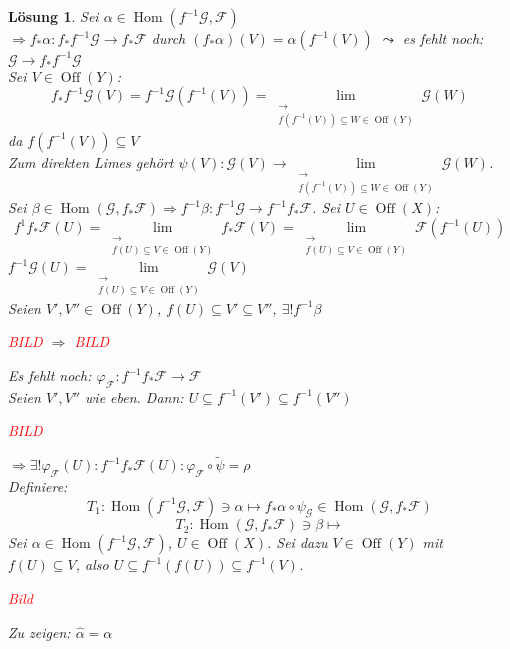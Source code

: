 \documentclass[a4paper,12pt]{report}
\theoremstyle{break}
\newtheorem{Loes}{L\"osung}
\theoremstyle{nonumberbreak}
\theoremstyle{nonumberplain}
\DeclareMathOperator{\Hom}{Hom}
\DeclareMathOperator{\Off}{Off}
\newcommand{\calF}{\mathcal{F}}
\newcommand{\calG}{\mathcal{G}}
\begin{document}
\begin{Loes}
Sei $\alpha \in \Hom(f^{-1}\calG, \calF)$\\
$\Rightarrow f_*\alpha : f_*f^{-1}\calG \to f_*\calF$ durch $(f_*\alpha)(V) = \alpha (f^{-1}(V))$ $\leadsto$ es fehlt noch: $\calG \to f_{*}f^{-1}\calG$\\
Sei $V \in \Off(Y)$:
	\[ f_{*}f^{-1}\calG(V) = f^{-1}\calG(f^{-1}(V)) = \lim\limits_{\substack{\to \\ f(f^{-1}(V)) \subseteq W \in \Off(Y)}} \calG(W)\]
da $f(f^{-1}(V)) \subseteq V$\\
Zum direkten Limes geh\"ort $\psi(V): \calG(V) \to \lim\limits_{\substack{\to \\ f(f^{-1}(V)) \subseteq W \in \Off(Y)}} \calG(W)$.\\
Sei $\beta \in \Hom(\calG, f_*\calF) \Rightarrow f^{-1}\beta: f^{-1}\calG \to f^{-1} f_*\calF$. Sei $U\in \Off(X)$:
	\[f^{1}f_*\calF(U) = \lim\limits_{\substack{\to \\ f(U) \subseteq V \in \Off(Y)}} f_*\calF(V) = \lim\limits_{\substack{\to \\ f(U) \subseteq V \in \Off(Y)}}\calF(f^{-1}(U)) \]
$f^{-1}\calG(U) = \lim\limits_{\substack{\to \\ f(U) \subseteq V \in \Off(Y)}} \calG(V)$\\
Seien $V', V'' \in \Off(Y)$, $f(U) \subseteq V' \subseteq V''$, $\exists! f^{-1}\beta$
\begin{center}
\textcolor{red}{BILD} $\Rightarrow$ \textcolor{red}{BILD}
\end{center}
Es fehlt noch: $\varphi_\calF: f^{-1}f_*\calF \to \calF$\\
Seien $V',V''$ wie eben. Dann: $U\subseteq f^{-1}(V') \subseteq f^{-1}(V'')$
\begin{center}
\textcolor{red}{BILD}
\end{center}
$\Rightarrow \exists! \varphi_\calF(U): f^{-1}f_*\calF(U): \varphi_\calF \circ \tilde \psi = \rho$\\
Definiere:
	\[ T_1: \Hom(f^{-1}\calG, \calF) \ni \alpha \mapsto f_* \alpha \circ \psi_\calG \in \Hom(\calG, f_*\calF) \]
	\[ T_2: \Hom(\calG, f_*\calF) \ni \beta \mapsto \]
Sei $\alpha \in \Hom(f^{-1}\calG, \calF)$, $U\in \Off(X)$. Sei dazu $V\in \Off(Y)$ mit $f(U)\subseteq V$, also $U\subseteq f^{-1}(f(U)) \subseteq f^{-1}(V)$.\\
\begin{center}
\textcolor{red}{Bild}
\end{center}
Zu zeigen: $\hat \alpha = \alpha$
\end{Loes}
\end{document}
